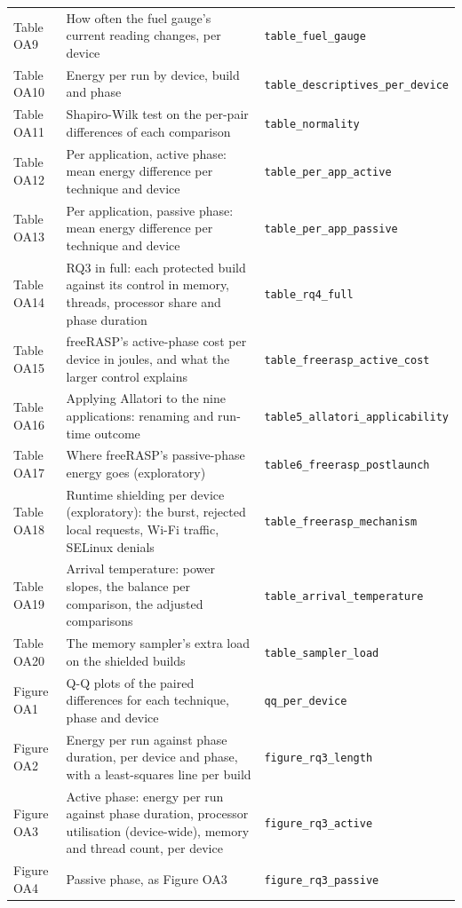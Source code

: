 \documentclass[10pt,a4paper]{article}
\begin{document}
\begin{center}
\begin{tabular}{lp{10cm}l}
Table OA9 & How often the fuel gauge's current reading changes, per device & \texttt{\footnotesize table\_fuel\_gauge} \\
Table OA10 & Energy per run by device, build and phase & \texttt{\footnotesize table\_descriptives\_per\_device} \\
Table OA11 & Shapiro-Wilk test on the per-pair differences of each comparison & \texttt{\footnotesize table\_normality} \\
Table OA12 & Per application, active phase: mean energy difference per technique and device & \texttt{\footnotesize table\_per\_app\_active} \\
Table OA13 & Per application, passive phase: mean energy difference per technique and device & \texttt{\footnotesize table\_per\_app\_passive} \\
Table OA14 & RQ3 in full: each protected build against its control in memory, threads, processor share and phase duration & \texttt{\footnotesize table\_rq4\_full} \\
Table OA15 & freeRASP's active-phase cost per device in joules, and what the larger control explains & \texttt{\footnotesize table\_freerasp\_active\_cost} \\
Table OA16 & Applying Allatori to the nine applications: renaming and run-time outcome & \texttt{\footnotesize table5\_allatori\_applicability} \\
Table OA17 & Where freeRASP's passive-phase energy goes (exploratory) & \texttt{\footnotesize table6\_freerasp\_postlaunch} \\
Table OA18 & Runtime shielding per device (exploratory): the burst, rejected local requests, Wi-Fi traffic, SELinux denials & \texttt{\footnotesize table\_freerasp\_mechanism} \\
Table OA19 & Arrival temperature: power slopes, the balance per comparison, the adjusted comparisons & \texttt{\footnotesize table\_arrival\_temperature} \\
Table OA20 & The memory sampler's extra load on the shielded builds & \texttt{\footnotesize table\_sampler\_load} \\
Figure OA1 & Q-Q plots of the paired differences for each technique, phase and device & \texttt{\footnotesize qq\_per\_device} \\
Figure OA2 & Energy per run against phase duration, per device and phase, with a least-squares line per build & \texttt{\footnotesize figure\_rq3\_length} \\
Figure OA3 & Active phase: energy per run against phase duration, processor utilisation (device-wide), memory and thread count, per device & \texttt{\footnotesize figure\_rq3\_active} \\
Figure OA4 & Passive phase, as Figure OA3 & \texttt{\footnotesize figure\_rq3\_passive} \\
\bottomrule\end{tabular}\end{center}
\end{document}
